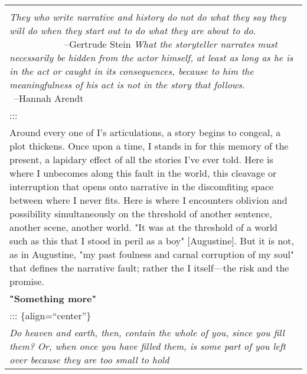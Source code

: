 \begin{longtable}[]{@{}l@{}}
\begin{minipage}[t]{0.97\columnwidth}
\end{minipage}\tabularnewline
\begin{minipage}[t]{0.97\columnwidth}\raggedright
\textbar{} \emph{They who write narrative and history do not do what
they say they \textbar{} will \textbar{} do when they start out to do
what they are about to do. \textbar{} } \textbar{} ~~~~~~~~~~
~--Gertrude Stein \textbar{} \textbar{} \emph{What the storyteller
narrates must necessarily be hidden from the \textbar{} actor \textbar{}
himself, at least as long as he is in the act or caught in its
\textbar{} consequences, because to him the meaningfulness of his act is
not in \textbar{} the \textbar{} story that follows.} \textbar{}
\textbar{} ~~~~~~~~~~ ~--Hannah Arendt\strut
\end{minipage}\tabularnewline
\begin{minipage}[t]{0.97\columnwidth}\raggedright
:::\strut
\end{minipage}\tabularnewline
\begin{minipage}[t]{0.97\columnwidth}\raggedright
Around every one of I's articulations, a story begins to congeal, a plot
thickens. Once upon a time, I stands in for this memory of the present,
a lapidary effect of all the stories I've ever told. Here is where I
unbecomes along this fault in the world, this cleavage or interruption
that opens onto narrative in the discomfiting space between where I
never fits. Here is where I encounters oblivion and possibility
simultaneously on the threshold of another sentence, another scene,
another world. "It was at the threshold of a world such as this that I
stood in peril as a boy" {[}Augustine{]}. But it is not, as in
Augustine, "my past foulness and carnal corruption of my soul" that
defines the narrative fault; rather the I itself---the risk and the
promise.\strut
\end{minipage}\tabularnewline
\begin{minipage}[t]{0.97\columnwidth}\raggedright
\textbf{"Something more"}\strut
\end{minipage}\tabularnewline
\begin{minipage}[t]{0.97\columnwidth}\raggedright
::: \{align=``center''\}\strut
\end{minipage}\tabularnewline
\begin{minipage}[t]{0.97\columnwidth}\raggedright
\textbar{} \emph{Do heaven and earth, then, contain the whole of you,
since you fill \textbar{} them? Or, when once you have filled them, is
some part of you left \textbar{} over because they are too small to hold
}
\end{minipage}
\end{longtable}
